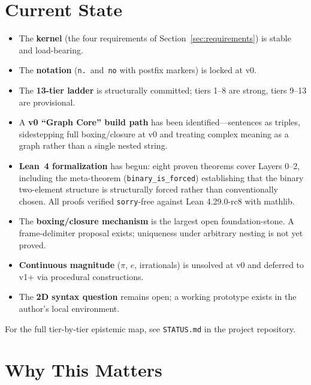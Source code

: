 \documentclass[12pt]{article}
\begin{document}
\section{Current State}
\label{sec:state}

\begin{itemize}[leftmargin=*, itemsep=0.35em]
    \item The \textbf{kernel} (the four requirements of Section~\ref{sec:requirements}) is stable and load-bearing.
    \item The \textbf{notation} (\texttt{n.}~and~\texttt{no} with postfix markers) is locked at v0.
    \item The \textbf{13-tier ladder} is structurally committed; tiers 1--8 are strong, tiers 9--13 are provisional.
    \item A \textbf{v0 ``Graph Core'' build path} has been identified---sentences as triples, sidestepping full boxing/closure at v0 and treating complex meaning as a graph rather than a single nested string.
    \item \textbf{Lean~4 formalization} has begun: eight proven theorems cover Layers 0--2, including the meta-theorem (\texttt{binary\_is\_forced}) establishing that the binary two-element structure is structurally forced rather than conventionally chosen. All proofs verified \texttt{sorry}-free against Lean 4.29.0-rc8 with mathlib.
    \item The \textbf{boxing/closure mechanism} is the largest open foundation-stone. A frame-delimiter proposal exists; uniqueness under arbitrary nesting is not yet proved.
    \item \textbf{Continuous magnitude} ($\pi$, $e$, irrationals) is unsolved at v0 and deferred to v1+ via procedural constructions.
    \item The \textbf{2D syntax question} remains open; a working prototype exists in the author's local environment.
\end{itemize}

For the full tier-by-tier epistemic map, see \texttt{STATUS.md} in the project repository.

\section{Why This Matters}
\label{sec:why}
\end{document}
